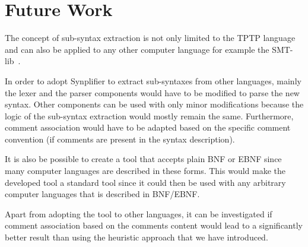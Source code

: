 \section{Future Work}\label{sec:FutureWork}

The concept of sub-syntax extraction is not only limited to the \ac{TPTP} language and can also be applied to any other computer language for example the SMT-lib~\cite{BFT-SMTLIB-17}.

In order to adopt \ac{Synplifier} to extract sub-syntaxes from other languages, mainly the lexer and the parser components would have to be modified to parse the new syntax. Other components can be used with only minor modifications because the logic of the sub-syntax extraction would mostly remain the same.
Furthermore, comment association would have to be adapted based on the specific comment convention (if comments are present in the syntax description).

It is also be possible to create a tool that accepts plain \ac{BNF} or \ac{EBNF} since many computer languages are described in these forms. This would make the developed tool a standard tool since it could then be used with any arbitrary computer languages that is described in \ac{BNF}/\ac{EBNF}.

Apart from adopting the tool to other languages, it can be investigated if comment association based on the comments content would lead to a significantly better result than using the heuristic approach that we have introduced.
